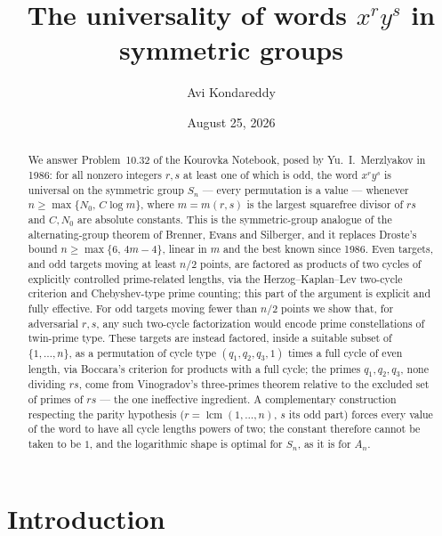 \documentclass[11pt]{amsart}
\title{The universality of words $x^ry^s$ in symmetric groups}
\author{Avi Kondareddy}
\date{August 25, 2026}
\numberwithin{equation}{section}
\theoremstyle{remark}
\begin{document}
\begin{abstract}
We answer Problem~10.32 of the Kourovka Notebook, posed by Yu.~I.~Merzlyakov in
1986: for all nonzero integers $r,s$ at least one of which is odd, the word
$x^ry^s$ is universal on the symmetric group $S_n$ --- every permutation is a
value --- whenever $n\ge\max\{N_0,\,C\log m\}$, where $m=m(r,s)$ is the largest
squarefree divisor of $rs$ and $C,N_0$ are absolute constants. This is the
symmetric-group analogue of the alternating-group theorem of Brenner, Evans and
Silberger, and it replaces Droste's bound $n\ge\max\{6,\,4m-4\}$, linear in $m$
and the best known since 1986. Even targets, and odd targets moving at least
$n/2$ points, are factored as products of two cycles of explicitly controlled
prime-related lengths, via the Herzog--Kaplan--Lev two-cycle criterion and
Chebyshev-type prime counting; this part of the argument is explicit and fully
effective. For odd targets moving fewer than $n/2$ points we show that, for
adversarial $r,s$, any such two-cycle factorization would encode prime
constellations of twin-prime type. These targets are instead factored, inside a
suitable subset of $\{1,\dots,n\}$, as a permutation of cycle type
$(q_1,q_2,q_3,1)$ times a full cycle of even length, via Boccara's criterion for
products with a full cycle; the primes $q_1,q_2,q_3$, none dividing $rs$, come
from Vinogradov's three-primes theorem relative to the excluded set of primes of
$rs$ --- the one ineffective ingredient. A complementary construction respecting
the parity hypothesis ($r=\operatorname{lcm}(1,\dots,n)$, $s$ its odd part)
forces every value of the word to have all cycle lengths powers of two; the
constant therefore cannot be taken to be $1$, and the logarithmic shape is
optimal for $S_n$, as it is for $A_n$.
\end{abstract}

\maketitle

\section{Introduction}\label{sec:intro}
\end{document}

